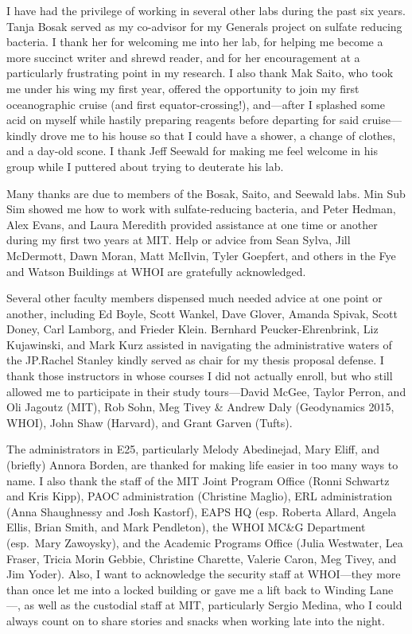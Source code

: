 I have had the privilege of working in several other labs during the
past six years.  Tanja Bosak served as my co-advisor for my Generals
project on sulfate reducing bacteria. I thank her for welcoming me into
her lab, for helping me become a more succinct writer and shrewd reader, and
for her encouragement at a particularly frustrating point in my
research. I also thank Mak Saito, who took me under his wing my first
year, offered the opportunity to join my first oceanographic cruise (and
first equator-crossing!), and---after I splashed some acid on myself
while hastily preparing reagents before departing for said
cruise---kindly drove me to his house so that I could have a shower, a
change of clothes, and a day-old scone.  I thank Jeff Seewald for making me feel welcome in his group while I
puttered about trying to deuterate his lab.  

Many thanks are due to members of the Bosak, Saito, and Seewald labs. Min Sub Sim
showed me how to work with sulfate-reducing bacteria, and Peter Hedman,
Alex Evans, and Laura Meredith provided assistance at one time or
another during my first two years at MIT. Help or advice from Sean Sylva, Jill McDermott,
Dawn Moran, Matt McIlvin, Tyler Goepfert, and others in the Fye and 
Watson Buildings at WHOI are gratefully acknowledged.

Several other faculty members dispensed much needed advice at one point
or another, including Ed Boyle, Scott Wankel, Dave Glover, Amanda
Spivak, Scott Doney, Carl Lamborg, and Frieder Klein. Bernhard Peucker-Ehrenbrink, Liz Kujawinski,
and Mark Kurz assisted in navigating the administrative waters of the
JP.\@ Rachel Stanley kindly served as chair for my thesis proposal
defense. I thank those instructors in whose courses I did not
actually enroll, but who still allowed me to participate in their study
tours---David McGee, Taylor Perron, and Oli Jagoutz (MIT),
Rob Sohn, Meg Tivey \& Andrew Daly (Geodynamics 2015, WHOI), John Shaw
(Harvard), and Grant Garven (Tufts).

The administrators in E25, particularly Melody Abedinejad, Mary Eliff,
and (briefly) Annora Borden, are thanked for making life easier in too
many ways to name. I also thank the staff of the MIT Joint Program
Office (Ronni Schwartz and Kris Kipp), PAOC administration (Christine
Maglio), ERL administration (Anna Shaughnessy and Josh Kastorf), EAPS HQ
(esp. Roberta Allard, Angela Ellis, Brian Smith, and Mark Pendleton),
the WHOI MC\&G Department (esp.\ Mary Zawoysky), and the Academic
Programs Office (Julia Westwater, Lea Fraser, Tricia Morin Gebbie,
Christine Charette, Valerie Caron, Meg Tivey, and Jim Yoder). Also, I
want to acknowledge the security staff at WHOI---they more than once let
me into a locked building or gave me a lift back to Winding Lane---, as
well as the custodial staff at MIT, particularly Sergio Medina, who I
could always count on to share stories and snacks when working late into
the night.

